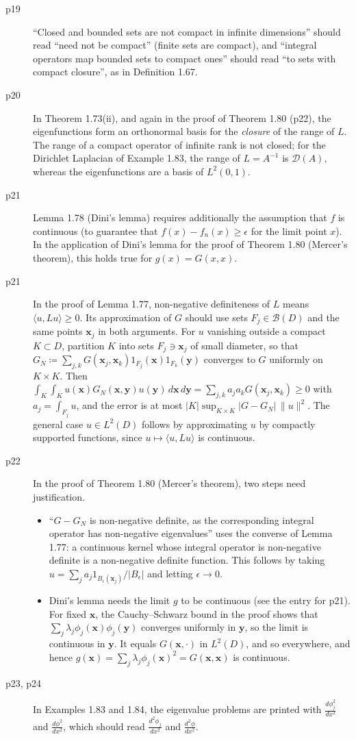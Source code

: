 \documentclass[final]{article}
\theoremstyle{definition}
\newcommand{\vecbs}[1]{\boldsymbol{#1}}
\renewcommand{\vec}[1]{{\vecbs{#1}}}
\begin{document}
\begin{enumerate}
\begin{description}
   \item[p19] ``Closed and bounded sets are not compact in infinite
dimensions'' should read ``need not be compact'' (finite sets are compact), and
``integral operators map bounded sets to compact ones'' should read ``to sets
with compact closure'', as in Definition 1.67.
   \item[p20] In Theorem 1.73(ii), and again in the proof of Theorem 1.80
(p22), the eigenfunctions form an orthonormal basis for the \emph{closure} of
the range of $L$. The range of a compact operator of infinite rank is not
closed; for the Dirichlet Laplacian of Example 1.83, the range of $L=A^{-1}$ is
$\mathcal{D}(A)$, whereas the eigenfunctions are a basis of $L^2(0,1)$.
\item[p21] Lemma 1.78 (Dini’s lemma) requires additionally the assumption that $f$ is continuous (to guarantee that
$f (x) - f_n(x) \ge\epsilon$  for the limit point $x$). In the application of Dini’s lemma for the proof of Theorem
1.80 (Mercer’s theorem), this holds true for $g(x) = G(x, x)$.
   \item[p21] In the proof of Lemma 1.77, non-negative definiteness
of $L$ means $\langle u,Lu\rangle\ge0$. Its approximation of $G$ should use
sets $F_j\in\mathcal{B}(D)$ and the same points $\vec x_j$ in both arguments. For $u$ vanishing outside a compact
$K\subset D$, partition $K$ into sets $F_j\ni\vec x_j$ of small diameter, so
that $G_N\coloneq\sum_{j,k}G(\vec x_j,\vec x_k)1_{F_j}(\vec x)1_{F_k}(\vec y)$
converges to $G$ uniformly on $K\times K$. Then
$\int_K\int_K u(\vec x)G_N(\vec x,\vec y)u(\vec y)\,d\vec x\,d\vec y
=\sum_{j,k}a_ja_kG(\vec x_j,\vec x_k)\ge0$ with $a_j=\int_{F_j}u$, and the
error is at most $|K|\sup_{K\times K}|G-G_N|\,\|u\|^2$. The general case $u\in L^2(D)$ follows
by approximating $u$ by compactly supported functions, since $u\mapsto\langle u,Lu\rangle$ is continuous.
   \item[p22] In the proof of Theorem 1.80 (Mercer's theorem), two steps need
justification.
\begin{itemize}
\item ``$G-G_N$ is non-negative definite, as the corresponding integral operator
has non-negative eigenvalues'' uses the converse of Lemma 1.77: a continuous
kernel whose integral operator is non-negative definite is a non-negative
definite function. This follows by taking
$u=\sum_ja_j1_{B_\epsilon(\vec x_j)}/|B_\epsilon|$ and letting $\epsilon\to0$.
\item Dini's lemma needs the limit $g$ to be continuous (see the entry for
p21). For fixed $\vec x$, the Cauchy--Schwarz bound in the proof shows that
$\sum_j\lambda_j\phi_j(\vec x)\phi_j(\vec y)$ converges uniformly in $\vec y$, so
the limit is continuous in $\vec y$. It equals $G(\vec x,\cdot)$ in $L^2(D)$, and
so everywhere, and hence $g(\vec x)=\sum_j\lambda_j\phi_j(\vec x)^2=G(\vec x,\vec x)$ is
continuous.
\end{itemize}
   \item[p23, p24] In Examples 1.83 and 1.84, the eigenvalue problems are
printed with $\frac{d\phi_j^{2}}{dx^{2}}$ and $\frac{d\phi^{2}}{dx^{2}}$, which
should read $\frac{d^{2}\phi_j}{dx^{2}}$ and $\frac{d^{2}\phi}{dx^{2}}$.


\end{description}
\end{enumerate}
\end{document}
